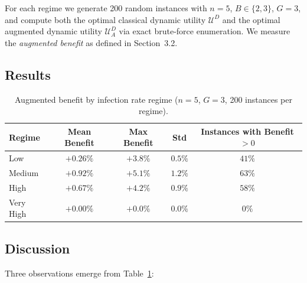 \documentclass[11pt]{article}
\newcommand{\UD}{\mathcal{U}^{D}}
\newcommand{\UDA}{\mathcal{U}^{D}_{A}}
\begin{document}
For each regime we generate 200 random instances with $n = 5$,
$B \in \{2, 3\}$, $G = 3$, and compute both the optimal classical
dynamic utility $\UD$ and the optimal augmented dynamic utility $\UDA$
via exact brute-force enumeration. We measure the \emph{augmented
benefit} as defined in Section~3.2.

\subsection{Results}

\begin{table}[h]
\centering
\caption{Augmented benefit by infection rate regime ($n{=}5$, $G{=}3$, 200 instances per regime).}
\label{tab:high-infection}
\begin{tabular}{@{}lcccc@{}}
\toprule
\textbf{Regime} & \textbf{Mean Benefit} & \textbf{Max Benefit} & \textbf{Std} & \textbf{Instances with Benefit $> 0$} \\
\midrule
Low        & $+0.26\%$ & $+3.8\%$  & $0.5\%$ & $41\%$ \\
Medium     & $+0.92\%$ & $+5.1\%$  & $1.2\%$ & $63\%$ \\
High       & $+0.67\%$ & $+4.2\%$  & $0.9\%$ & $58\%$ \\
Very High  & $+0.00\%$ & $+0.0\%$  & $0.0\%$ & $0\%$  \\
\bottomrule
\end{tabular}
\end{table}

\subsection{Discussion}

Three observations emerge from Table~\ref{tab:high-infection}:
\end{document}
